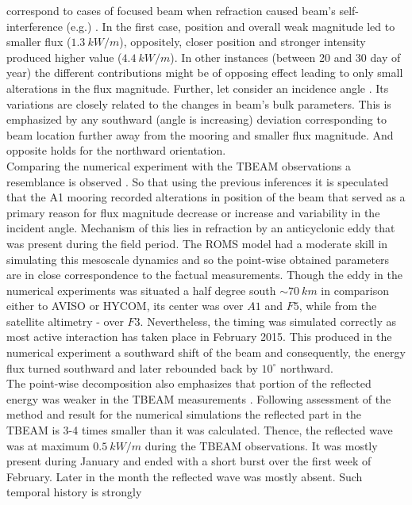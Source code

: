 \documentclass[12pt]{article}
\begin{document}
correspond to cases of focused beam when refraction caused beam's self-interference (e.g.)
. In the first case, position and overall weak magnitude led to smaller 
flux ($1.3~kW/m$), oppositely, closer position and stronger intensity produced higher value 
($4.4~kW/m$). In other instances (between 20 and 30 day of year) the different contributions might 
be of opposing effect leading to only small alterations in the flux magnitude. Further, let 
consider an incidence angle . Its variations are closely related to 
the changes in beam's bulk parameters. This is emphasized by any southward (angle is increasing) 
deviation corresponding to beam location further away from the mooring and smaller flux magnitude. 
And opposite holds for the northward orientation.\\
Comparing the numerical experiment with the TBEAM observations a resemblance is observed 
. So that using the previous inferences it is speculated that 
the A1 mooring recorded alterations in position of the beam that served as a primary reason for 
flux magnitude decrease or increase and variability in the incident angle. Mechanism of this lies 
in refraction by an anticyclonic eddy that was present during the field period. The ROMS model had 
a moderate skill in simulating this mesoscale dynamics and so the point-wise obtained parameters 
are in close correspondence to the factual measurements. Though the eddy in the numerical 
experiments was situated a half degree south $\sim 70~km$ in comparison either to AVISO or HYCOM, 
its center was over $A1$ and $F5$, while from the satellite altimetry - over $F3$. Nevertheless, 
the timing was simulated correctly as most active interaction has taken place in February 2015. 
This produced in the numerical experiment a southward shift of the beam and consequently, the 
energy flux turned southward  and later rebounded back by 
$10^\circ$ northward.\\
The point-wise decomposition also emphasizes that portion of the reflected energy was weaker in the 
TBEAM measurements . Following assessment of the method and result 
for the numerical simulations the reflected part in the TBEAM is 3-4 times smaller than it was 
calculated. Thence, the reflected wave was at maximum $0.5~kW/m$ during the TBEAM observations. It 
was mostly present during January and ended with a short burst over the first week of February.  
Later in the month the reflected wave was mostly absent. Such temporal history is strongly 
\end{document}
